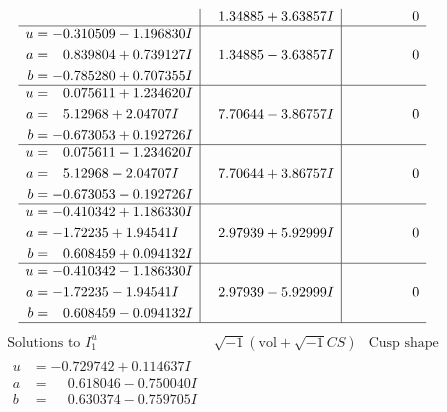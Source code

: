 \documentclass[1p]{elsarticle_modified}
\theoremstyle{definition}
\newcommand{\I}{\sqrt{-1}}
\begin{document}
$$\begin{array}{c|c|c}
 & \phantom{-}1.34885 + 3.63857 I & \phantom{-0.000000 } 0 \\ \hline\begin{aligned}
u &= -0.310509 - 1.196830 I \\
a &= \phantom{-}0.839804 + 0.739127 I \\
b &= -0.785280 + 0.707355 I\end{aligned}
 & \phantom{-}1.34885 - 3.63857 I & \phantom{-0.000000 } 0 \\ \hline\begin{aligned}
u &= \phantom{-}0.075611 + 1.234620 I \\
a &= \phantom{-}5.12968 + 2.04707 I \\
b &= -0.673053 + 0.192726 I\end{aligned}
 & \phantom{-}7.70644 - 3.86757 I & \phantom{-0.000000 } 0 \\ \hline\begin{aligned}
u &= \phantom{-}0.075611 - 1.234620 I \\
a &= \phantom{-}5.12968 - 2.04707 I \\
b &= -0.673053 - 0.192726 I\end{aligned}
 & \phantom{-}7.70644 + 3.86757 I & \phantom{-0.000000 } 0 \\ \hline\begin{aligned}
u &= -0.410342 + 1.186330 I \\
a &= -1.72235 + 1.94541 I \\
b &= \phantom{-}0.608459 + 0.094132 I\end{aligned}
 & \phantom{-}2.97939 + 5.92999 I & \phantom{-0.000000 } 0 \\ \hline\begin{aligned}
u &= -0.410342 - 1.186330 I \\
a &= -1.72235 - 1.94541 I \\
b &= \phantom{-}0.608459 - 0.094132 I\end{aligned}
 & \phantom{-}2.97939 - 5.92999 I & \phantom{-0.000000 } 0\\
 \hline 
 \end{array}$$\newpage$$\begin{array}{c|c|c}  
\text{Solutions to }I^u_{1}& \I (\text{vol} + \sqrt{-1}CS) & \text{Cusp shape}\\
 \hline 
\begin{aligned}
u &= -0.729742 + 0.114637 I \\
a &= \phantom{-}0.618046 - 0.750040 I \\
b &= \phantom{-}0.630374 - 0.759705 I\end{aligned}

\end{array}$$
\end{document}
